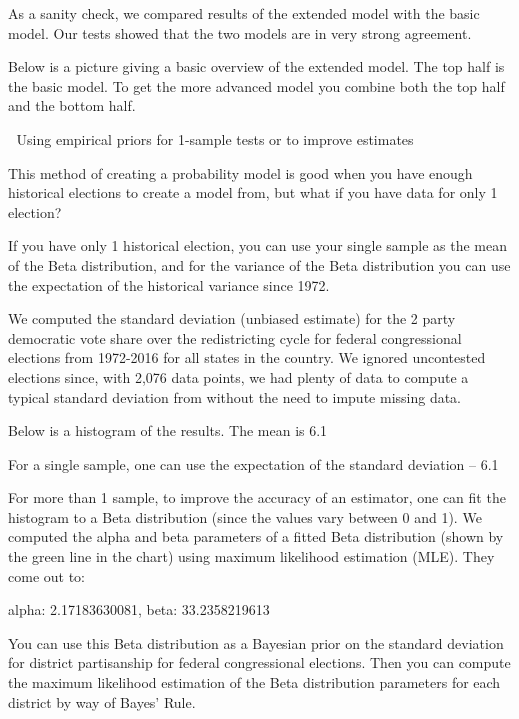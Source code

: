 \documentclass[preprint,12pt]{article}
\begin{document}
As a sanity check, we compared results of the extended model with the basic model.  Our tests showed that the two models are in very strong agreement. 
 
Below is a picture giving a basic overview of the extended model.  The top half is the basic model.  To get the more advanced model you combine both the top half and the bottom half.


 

Using empirical priors for 1-sample tests or to improve estimates
 
This method of creating a probability model is good when you have enough historical elections to create a model from, but what if you have data for only 1 election?
 
If you have only 1 historical election, you can use your single sample as the mean of the Beta distribution, and for the variance of the Beta distribution you can use the expectation of the historical variance since 1972.
 
We computed the standard deviation (unbiased estimate) for the 2 party democratic vote share over the redistricting cycle for federal congressional elections from 1972-2016 for all states in the country. We ignored uncontested elections since, with 2,076 data points, we had plenty of data to compute a typical standard deviation from without the need to impute missing data.
 
Below is a histogram of the results.  The mean is 6.1%

 
For a single sample, one can use the expectation of the standard deviation -- 6.1%
 
For more than 1 sample, to improve the accuracy of an estimator, one can fit the histogram to a Beta distribution (since the values vary between 0 and 1).  We computed the alpha and beta parameters of a fitted Beta distribution (shown by the green line in the chart) using maximum likelihood estimation (MLE). They come out to:
 
{ alpha: 2.17183630081, beta: 33.2358219613 }
 
You can use this Beta distribution as a Bayesian prior on the standard deviation for district partisanship for federal congressional elections.  Then you can compute the maximum likelihood estimation of the Beta distribution parameters for each district by way of Bayes’ Rule.  
 
\end{document}
